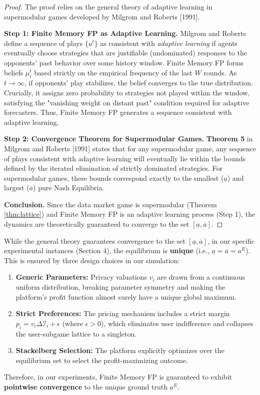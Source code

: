 \begin{proof}
The proof relies on the general theory of adaptive learning in supermodular games developed by Milgrom and Roberts [1991].

\textbf{Step 1: Finite Memory FP as Adaptive Learning.}
Milgrom and Roberts define a sequence of plays $\{a^t\}$ as consistent with \textit{adaptive learning} if agents eventually choose strategies that are justifiable (undominated) responses to the opponents' past behavior over some history window. 
Finite Memory FP forms beliefs $\mu_i^t$ based strictly on the empirical frequency of the last $W$ rounds. As $t \to \infty$, if opponents' play stabilizes, the belief converges to the true distribution. Crucially, it assigns zero probability to strategies not played within the window, satisfying the "vanishing weight on distant past" condition required for adaptive forecasters. Thus, Finite Memory FP generates a sequence consistent with adaptive learning.

\textbf{Step 2: Convergence Theorem for Supermodular Games.}
\textbf{Theorem 5} in Milgrom and Roberts [1991] states that for any supermodular game, any sequence of plays consistent with adaptive learning will eventually lie within the bounds defined by the iterated elimination of strictly dominated strategies. For supermodular games, these bounds correspond exactly to the smallest ($\underline{a}$) and largest ($\overline{a}$) pure Nash Equilibria.

\textbf{Conclusion.}
Since the data market game is supermodular (Theorem \ref{thm:lattice}) and Finite Memory FP is an adaptive learning process (Step 1), the dynamics are theoretically guaranteed to converge to the set $[\underline{a}, \overline{a}]$.
\end{proof}

\begin{remark}
While the general theory guarantees convergence to the set $[\underline{a}, \overline{a}]$, in our specific experimental instances (Section 4), the equilibrium is \textbf{unique} (i.e., $\underline{a} = \overline{a} = a^E$). This is ensured by three design choices in our simulation:
\begin{enumerate}
    \item \textbf{Generic Parameters:} Privacy valuations $v_i$ are drawn from a continuous uniform distribution, breaking parameter symmetry and making the platform's profit function almost surely have a unique global maximum.
    \item \textbf{Strict Preferences:} The pricing mechanism includes a strict margin $p_i = v_i \Delta \mathcal{I}_i + \epsilon$ (where $\epsilon > 0$), which eliminates user indifference and collapses the user-subgame lattice to a singleton.
    \item \textbf{Stackelberg Selection:} The platform explicitly optimizes over the equilibrium set to select the profit-maximizing outcome.
\end{enumerate}
Therefore, in our experiments, Finite Memory FP is guaranteed to exhibit \textbf{pointwise convergence} to the unique ground truth $a^E$.
\end{remark}

